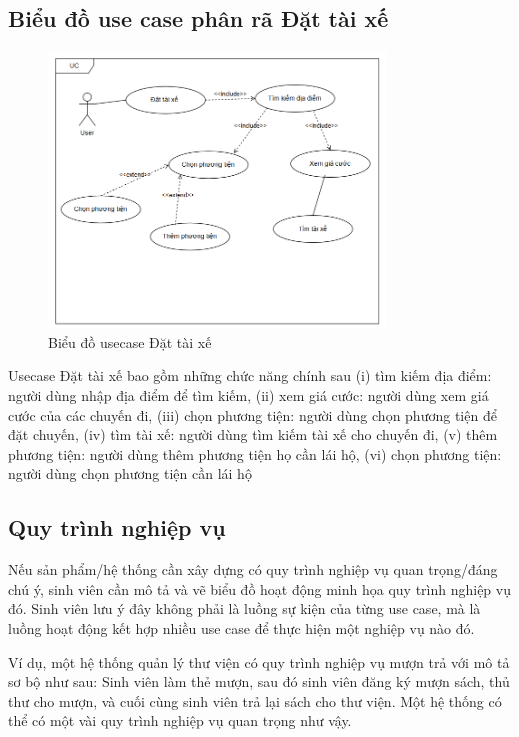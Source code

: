 \documentclass[../DoAn.tex]{subfiles}
\begin{document}
\subsection{Biểu đồ use case phân rã Đặt tài xế}
\label{subsection:2.2.3}
\begin{figure}[H]
  \centering
  \includegraphics[width=0.8\textwidth]{Hinhve/Usecase_dat_tai_xe.png}
  \caption{Biểu đồ usecase Đặt tài xế}
  \label{fig:use_case_dat_tai_xe}
\end{figure}
Usecase Đặt tài xế bao gồm những chức năng chính sau (i) tìm kiếm địa điểm: người dùng nhập địa điểm để tìm kiếm, (ii) xem giá cước: người dùng xem giá cước của các chuyến đi, (iii) chọn phương tiện: người dùng chọn phương tiện để đặt chuyến, (iv) tìm tài xế: người dùng tìm kiếm tài xế cho chuyến đi, (v) thêm phương tiện: người dùng thêm phương tiện họ cần lái hộ, (vi) chọn phương tiện: người dùng chọn phương tiện cần lái hộ

\subsection{Quy trình nghiệp vụ}
\label{subsection:2.2.3}
Nếu sản phẩm/hệ thống cần xây dựng có quy trình nghiệp vụ quan trọng/đáng chú ý, sinh viên cần mô tả và vẽ biểu đồ hoạt động minh họa quy trình nghiệp vụ đó. Sinh viên lưu ý đây không phải là luồng sự kiện của từng use case, mà là luồng hoạt động kết hợp nhiều use case để thực hiện một nghiệp vụ nào đó.

Ví dụ, một hệ thống quản lý thư viện có quy trình nghiệp vụ mượn trả với mô tả sơ bộ như sau: Sinh viên làm thẻ mượn, sau đó sinh viên đăng ký mượn sách, thủ thư cho mượn, và cuối cùng sinh viên trả lại sách cho thư viện. Một hệ thống có thể có một vài quy trình nghiệp vụ quan trọng như vậy.
\end{document}
